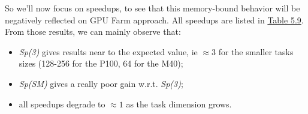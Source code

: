 So we'll now focus on speedups, to see that this memory-bound behavior will be negatively reflected on GPU Farm approach. All speedups are listed in \hyperref[tab:matspeedup]{Table 5.9}.\\
From those results, we can mainly observe that:
\begin{itemize}
	\item \textit{Sp(3)} gives results near to the expected value, ie \(\approx 3\) for the smaller tasks sizes (128-256 for the P100, 64 for the M40);
	
	\item \textit{Sp(SM)} gives a really poor gain w.r.t. \textit{Sp(3)};
	
	\item all speedups degrade  to \(\approx1\) as the task dimension grows.
\end{itemize}

